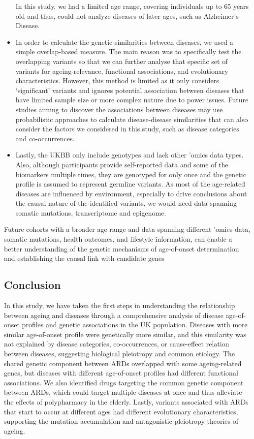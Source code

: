\documentclass[12pt,twoside]{unicam}
\begin{document}
\begin{itemize}
  In this study, we had a limited age range, covering individuals up to 65 years old and thus, could not analyze diseases of later ages, such as Alzheimer's Disease.
\item
  In order to calculate the genetic similarities between diseases, we used a simple overlap-based measure. The main reason was to specifically test the overlapping variants so that we can further analyse that specific set of variants for ageing-relevance, functional associations, and evolutionary characteristics. However, this method is limited as it only considers `significant' variants and ignores potential association between diseases that have limited sample size or more complex nature due to power issues. Future studies aiming to discover the associations between diseases may use probabilistic approaches to calculate disease-disease similarities that can also consider the factors we considered in this study, such as disease categories and co-occurrences.
\item
  Lastly, the UKBB only include genotypes and lack other 'omics data types. Also, although participants provide self-reported data and some of the biomarkers multiple times, they are genotyped for only once and the genetic profile is assumed to represent germline variants. As most of the age-related diseases are influenced by environment, especially to drive conclusions about the causal nature of the identified variants, we would need data spanning somatic mutations, transcriptome and epigenome.
\end{itemize}

Future cohorts with a broader age range and data spanning different 'omics data, somatic mutations, health outcomes, and lifestyle information, can enable a better understanding of the genetic mechanisms of age-of-onset determination and establishing the causal link with candidate genes

\hypertarget{conclusion-1}{%
\subsection{Conclusion}\label{conclusion-1}}

In this study, we have taken the first steps in understanding the relationship between ageing and diseases through a comprehensive analysis of disease age-of-onset profiles and genetic associations in the UK population. Diseases with more similar age-of-onset profile were genetically more similar, and this similarity was not explained by disease categories, co-occurrences, or cause-effect relation between diseases, suggesting biological pleiotropy and common etiology. The shared genetic component between ARDs overlapped with some ageing-related genes, but diseases with different age-of-onset profiles had different functional associations. We also identified drugs targeting the common genetic component between ARDs, which could target multiple diseases at once and thus alleviate the effects of polypharmacy in the elderly. Lastly, variants associated with ARDs that start to occur at different ages had different evolutionary characteristics, supporting the mutation accumulation and antagonistic pleiotropy theories of ageing.
\end{document}
